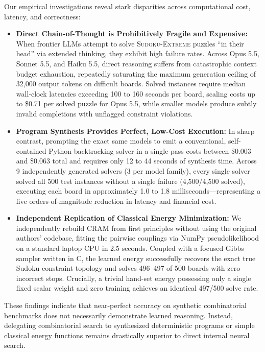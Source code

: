 \documentclass{article} %
\begin{document}
Our empirical investigations reveal stark disparities across computational cost, latency, and correctness:
\begin{itemize}
    \item \textbf{Direct Chain-of-Thought is Prohibitively Fragile and Expensive:} When frontier LLMs attempt to solve \textsc{Sudoku-Extreme} puzzles ``in their head'' via extended thinking, they exhibit high failure rates. Across Opus 5.5, Sonnet 5.5, and Haiku 5.5, direct reasoning suffers from catastrophic context budget exhaustion, repeatedly saturating the maximum generation ceiling of 32,000 output tokens on difficult boards. Solved instances require median wall-clock latencies exceeding 100 to 160 seconds per board, scaling costs up to \$0.71 per solved puzzle for Opus 5.5, while smaller models produce subtly invalid completions with unflagged constraint violations.
    \item \textbf{Program Synthesis Provides Perfect, Low-Cost Execution:} In sharp contrast, prompting the exact same models to emit a conventional, self-contained Python backtracking solver in a single pass costs between \$0.003 and \$0.063 total and requires only 12 to 44 seconds of synthesis time. Across 9 independently generated solvers (3 per model family), every single solver solved all 500 test instances without a single failure (4,500/4,500 solved), executing each board in approximately 1.0 to 1.8 milliseconds---representing a five orders-of-magnitude reduction in latency and financial cost.
    \item \textbf{Independent Replication of Classical Energy Minimization:} We independently rebuild CRAM from first principles without using the original authors' codebase, fitting the pairwise couplings via NumPy pseudolikelihood on a standard laptop CPU in 2.5 seconds. Coupled with a focused Gibbs sampler written in C, the learned energy successfully recovers the exact true Sudoku constraint topology and solves 496--497 of 500 boards with zero incorrect stops. Crucially, a trivial hand-set energy possessing only a single fixed scalar weight and zero training achieves an identical 497/500 solve rate.
\end{itemize}

These findings indicate that near-perfect accuracy on synthetic combinatorial benchmarks does not necessarily demonstrate learned reasoning. Instead, delegating combinatorial search to synthesized deterministic programs or simple classical energy functions remains drastically superior to direct internal neural search.
\end{document}
